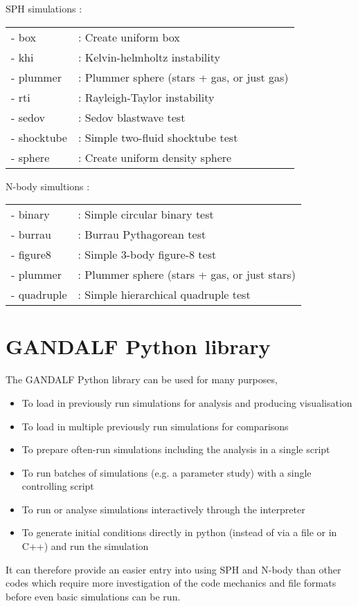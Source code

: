 \documentclass[a4paper]{article}
\begin{document}
\noindent SPH simulations : \\
\begin{tabular}{ll}
- box       &: Create uniform box \\
- khi       &: Kelvin-helmholtz instability \\
- plummer   &: Plummer sphere (stars + gas, or just gas) \\
- rti       &: Rayleigh-Taylor instability \\
- sedov     &: Sedov blastwave test \\
- shocktube &: Simple two-fluid shocktube test \\
- sphere    &: Create uniform density sphere
\end{tabular}
\newline

\noindent N-body simultions : \\
\begin{tabular}{ll}
- binary    &: Simple circular binary test \\
- burrau    &: Burrau Pythagorean test \\
- figure8   &: Simple 3-body figure-8 test \\
- plummer   &: Plummer sphere (stars + gas, or just stars) \\
- quadruple &: Simple hierarchical quadruple test
\end{tabular}

\newpage



\section{GANDALF Python library} \label{S:PYTHONSCRIPT}

The GANDALF Python library can be used for many purposes, 
\begin{itemize}
\item To load in previously run simulations for analysis and producing visualisation
\item To load in multiple previously run simulations for comparisons
\item To prepare often-run simulations including the analysis in a single script 
\item To run batches of simulations (e.g. a parameter study) with a single controlling script
\item To run or analyse simulations interactively through the interpreter
\item To generate initial conditions directly in python (instead of via a file or in C++) and run the simulation
\end{itemize}
It can therefore provide an easier entry into using SPH and N-body than other codes which require more investigation of the code mechanics and file formats before even basic simulations can be run.
\end{document}
